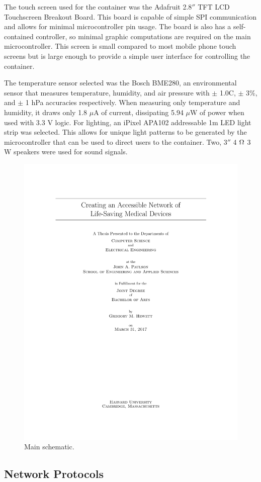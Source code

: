The touch screen used for the container was the Adafruit 2.8$''$ TFT LCD Touchscreen Breakout Board. This board is capable of simple SPI communication and allows for minimal microcontroller pin usage. The board is also has a self-contained controller, so minimal graphic computations are required on the main microcontroller. This screen is small compared to most mobile phone touch screens but is large enough to provide a simple user interface for controlling the container.

The temperature sensor selected was the Bosch BME280, an environmental sensor that measures temperature, humidity, and air pressure with $\pm$ 1.0\degree C, $\pm$ 3\%, and $\pm$ 1 hPa accuracies respectively. When measuring only temperature and humidity, it draws only 1.8 $\mu$A of current, dissipating 5.94 $\mu$W of power when used with 3.3 V logic. For lighting, an iPixel APA102 addressable 1m LED light strip was selected. This allows for unique light patterns to be generated by the microcontroller that can be used to direct users to the container. Two, 3$''$ 4 $\ohm$ 3 W speakers were used for sound signals. 

\begin{figure}
\includegraphics[width=\linewidth]{main}
\caption{Main schematic.}
\label{fig:mainschem}
\end{figure}

\subsection{Network Protocols}











